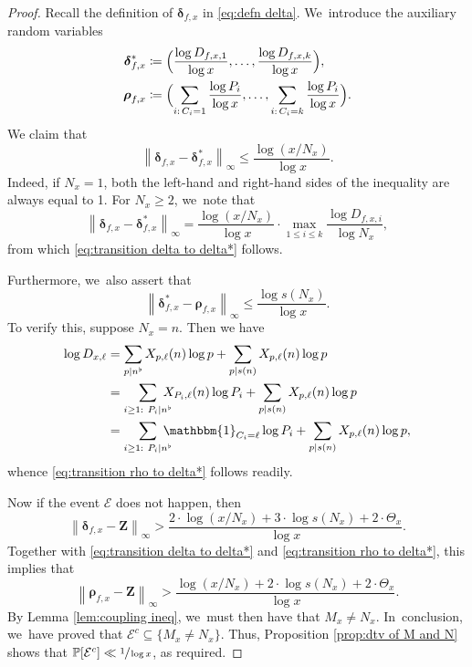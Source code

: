 \documentclass[JEP,XML,SOM,Unicode,published]{cedram}
\newcommand{\bZ}{{\boldsymbol Z}}
\newcommand{\PP}{\mathbb{P}}
\newcommand{\bolddelta}{\boldsymbol{\delta}}
\newcommand{\boldrho}{\boldsymbol{\rho}}
\newcommand{\one}{\mathbbm{1}}
\newcommand{\maxnorm}[1]{\left\| #1 \right\|_{\infty}}
\theoremstyle{plain}
\theoremstyle{definition}
\begin{document}
\begin{proof}
Recall the definition of $\bolddelta_{f, x}$ in \eqref{eq:defn delta}. We~introduce the auxiliary random variables
\begin{equation}
\label{eq:defn delta* and rho}
\begin{aligned}
\bolddelta_{f, x}^* &\coloneqq \Bigl(\frac{\log D_{f,x,1}}{\log x}, \ldots, \frac{\log D_{f,x,k}}{\log x} \Bigr),\\
\boldrho_{f, x} &\coloneqq \Bigl(\sum_{i:\, C_i=1} \frac{\log P_i}{\log x}, \ldots, \sum_{i:\, C_i=k} \frac{\log P_i}{\log x} \Bigr).
\end{aligned}
\end{equation}
We claim that
\begin{equation}
\label{eq:transition delta to delta*}
\maxnorm{ \bolddelta_{f, x} - \bolddelta_{f, x}^*} \le \frac{\log(x/N_x)}{\log x}.
\end{equation}
Indeed, if $N_x = 1$, both the left-hand and right-hand sides of the inequality are always equal to 1. For $N_x \ge 2$, we~note that
\[
\maxnorm{ \bolddelta_{f, x} - \bolddelta_{f, x}^*} = \frac{\log(x/N_x)}{\log x} \cdot \max_{1 \le i \le k} \frac{\log D_{f,x,i}}{\log N_x},
\]
from which \eqref{eq:transition delta to delta*} follows.

Furthermore, we~also assert that
\begin{equation}
\label{eq:transition rho to delta*}
\maxnorm{\bolddelta_{f, x}^* - \boldrho_{f, x}} \le \frac{\log s(N_x)}{\log x}.
\end{equation}
To verify this, suppose $N_x=n$. Then we have
\begin{align*}
\log D_{x,\ell} &= \sum_{p|n^\flat} X_{p, \ell}(n) \log p + \sum_{p|s(n)} X_{p, \ell}(n) \log p \\
&=\sum_{i\ge1:\ P_i|n^\flat}\hspace*{-3mm} X_{P_i, \ell}(n) \log P_i + \sum_{p|s(n)} X_{p,\ell}(n) \log p \\
&=\sum_{i\ge1:\ P_i|n^\flat}\hspace*{-3mm} \one_{C_i=\ell} \log P_i + \sum_{p|s(n)} X_{p,\ell}(n) \log p,
\end{align*}
whence \eqref{eq:transition rho to delta*} follows readily.

Now if the event $\mathcal E$ does not happen, then
\[
\maxnorm{\bolddelta_{f, x} - \bZ} > \frac{2 \cdot \log(x/N_x) + 3 \cdot \log s(N_x) + 2\cdot \Theta_x}{\log x}.
\]
Together with \eqref{eq:transition delta to delta*} and \eqref{eq:transition rho to delta*}, this implies that
\[
\maxnorm{\boldrho_{f, x} - \bZ} > \frac{\log(x/N_x) + 2 \cdot \log s(N_x) + 2\cdot \Theta_x}{\log x}.
\]
By Lemma \ref{lem:coupling ineq}, we~must then have that $M_x \ne N_x$. In~conclusion, we~have proved that $\mathcal{E}^c\subseteq\{M_x\ne N_x\}$. Thus, Proposition \ref{prop:dtv of M and N} shows that $\PP[\mathcal E^c] \ll \sfrac{1}{\log x}$, as required.
\end{proof}
\end{document}
